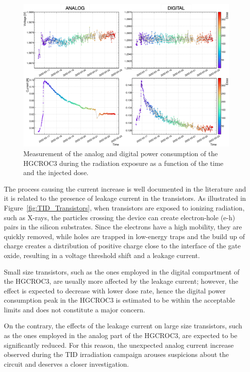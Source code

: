 \begin{figure}
    \centering
    \includegraphics[width=0.99\linewidth]{Figures/HGCAL/TID_Power.pdf}
    \caption{Measurement of the analog and digital power consumption of the HGCROC3 during the radiation exposure as a function of the time and the injected dose.}
    \label{fig:TID_Power}
\end{figure}

\bigbreak

The process causing the current increase is well documented in the literature and it is related to the presence of leakage current in the transistors. 
As illustrated in Figure~\ref{fig:TID_Transistors}, when transistors are exposed to ionizing radiation, such as X-rays, the particles crossing the device can create electron-hole (e-h) pairs in the silicon substrates. Since the electrons have a high mobility, they are quickly removed, while holes are trapped in low-energy traps and the build up of charge creates a distribution of positive charge close to the interface of the gate oxide, resulting in a voltage threshold shift and a leakage current. 

\bigbreak

Small size transistors, such as the ones employed in the digital compartment of the HGCROC3, are usually more affected by the leakage current; however, the effect is expected to decrease with lower dose rate, hence the digital power consumption peak in the HGCROC3 is estimated to be within the acceptable limits and does not constitute a major concern.

On the contrary, the effects of the leakage current on large size transistors, such as the ones employed in the analog part of the HGCROC3, are expected to be significantly reduced. For this reason, the unexpected analog current increase observed during the TID irradiation campaign arouses suspicions about the circuit and deserves a closer investigation.

